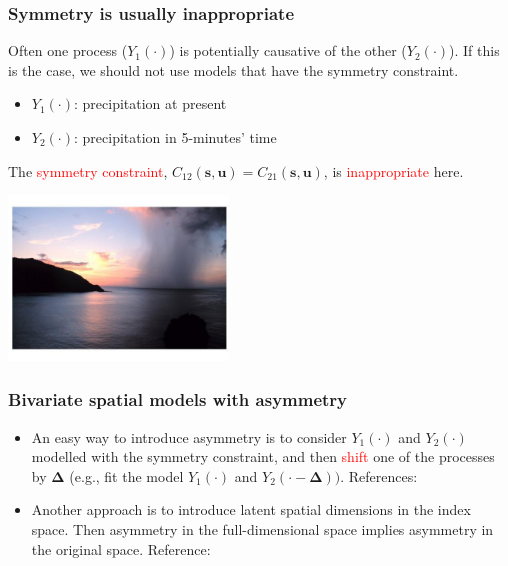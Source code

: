 \documentclass{beamer}
\newcommand{\Deltab} {\boldsymbol{\Delta}}
\newcommand{\s}{\mathbf{s}}
\renewcommand{\u}{\mathbf{u}}
\begin{document}
\begin{frame}
\frametitle{Symmetry is usually inappropriate}
Often one process ($Y_{1}(\cdot)$) is potentially causative of the other ($Y_2(\cdot)$). If this is the case, we should not use models that have the symmetry constraint.
\begin{itemize}
\item $Y_1(\cdot)$: precipitation at present
\item $Y_2(\cdot)$: precipitation in 5-minutes' time
\end{itemize}
The \textcolor{red}{symmetry constraint}, $C_{12}(\s,\u)=C_{21}(\s,\u)$, is \textcolor{red}{inappropriate} here.
\vspace{-0.5cm}

\begin{center}
\includegraphics[width=2.3in]{rain.png}
\end{center}
\end{frame}


\begin{frame}
\frametitle{Bivariate spatial models with asymmetry}

\begin{itemize}
\item An easy way to introduce asymmetry is to consider $Y_1(\cdot)$ and $Y_2(\cdot)$ modelled with the symmetry constraint, and then \textcolor{red}{shift} one of the processes by $\Deltab$ (e.g., fit the model $Y_1(\cdot)$ and $Y_2(\cdot-\Deltab))$. 
\newline References: \cite{VerHoefCressie1993,ChristensenAmemiya2001,ChristensenAmemiya2002,Li_2011}
\vfill
\item Another approach is to introduce latent spatial dimensions in the index space. Then asymmetry in the full-dimensional space implies asymmetry in the original space. Reference:~\cite{Apanasovich_2010}
\end{itemize}
\vfill
\end{frame}

\end{document}
